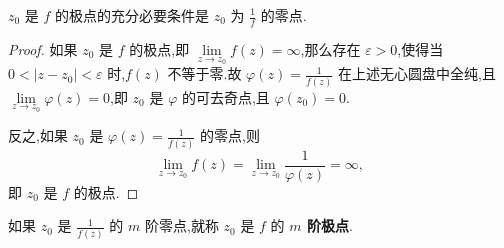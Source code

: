 \documentclass[../../main.tex]{subfiles}
\begin{document}
\begin{proposition}\label{proposition:命题5.2.2}
\( z_0 \) 是 \( f \) 的极点的充分必要条件是 \( z_0 \) 为 \( \frac{1}{f} \) 的零点.
\end{proposition}
\begin{proof}
如果 \( z_0 \) 是 \( f \) 的极点,即 \( \lim\limits_{z \to z_0} f(z) = \infty \),那么存在 \( \varepsilon > 0 \),使得当 \( 0 < |z - z_0| < \varepsilon \) 时,\( f(z) \) 不等于零.故 \( \varphi(z) = \frac{1}{f(z)} \) 在上述无心圆盘中全纯,且 \( \lim\limits_{z \to z_0} \varphi(z) = 0 \),即 \( z_0 \) 是 \( \varphi \) 的可去奇点,且 \( \varphi(z_0) = 0 \).

反之,如果 \( z_0 \) 是 \( \varphi(z) = \frac{1}{f(z)} \) 的零点,则
\[
\lim\limits_{z \to z_0} f(z) = \lim\limits_{z \to z_0} \frac{1}{\varphi(z)} = \infty,
\]
即 \( z_0 \) 是 \( f \) 的极点.

\end{proof}
 
\begin{definition}
如果 \( z_0 \) 是 \( \frac{1}{f(z)} \) 的 \( m \) 阶零点,就称 \( z_0 \) 是 \( f \) 的 \textbf{\( m \) 阶极点}.
\end{definition}
\end{document}

